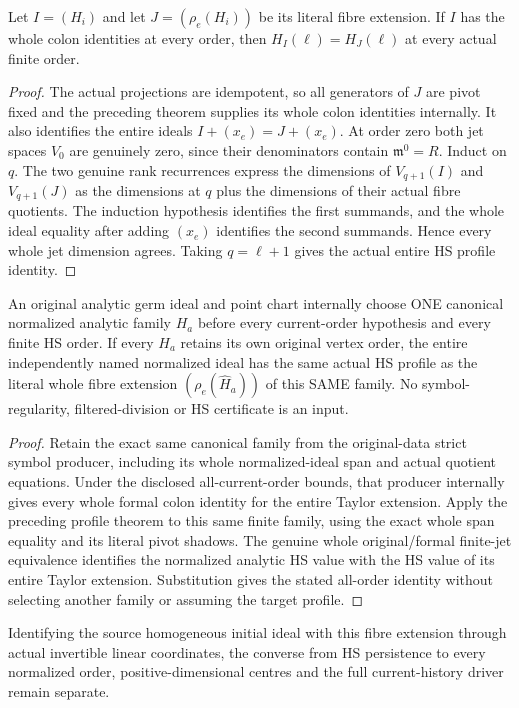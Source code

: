 \begin{theorem}
\label{hir:actual-exceptional-regular-symbol-fibre-hs-profile}
\leanok
Let $I=(H_i)$ and let $J=(\rho_e(H_i))$ be its literal fibre extension.
If $I$ has the whole colon identities at every order, then
$H_I(\ell)=H_J(\ell)$ at every actual finite order.
\end{theorem}
\begin{proof}
The actual projections are idempotent, so all generators of $J$ are
pivot fixed and the preceding theorem supplies its whole colon
identities internally. It also identifies the entire ideals
$I+(x_e)=J+(x_e)$. At order zero both jet spaces $V_0$ are genuinely
zero, since their denominators contain $\mathfrak m^0=R$.
Induct on $q$. The two genuine rank recurrences express the dimensions
of $V_{q+1}(I)$ and $V_{q+1}(J)$ as the dimensions at $q$ plus the
dimensions of their actual fibre quotients. The induction hypothesis
identifies the first summands, and the whole ideal equality after
adding $(x_e)$ identifies the second summands. Hence every whole jet
dimension agrees. Taking $q=\ell+1$ gives the actual entire HS profile
identity.
\end{proof}

\begin{theorem}
\label{hir:actual-original-point-order-retaining-fibre-hs-profile}
\leanok
An original analytic germ ideal and point chart internally choose ONE
canonical normalized analytic family $H_a$ before every current-order
hypothesis and every finite HS order. If every $H_a$ retains its own
original vertex order, the entire independently named normalized ideal
has the same actual HS profile as the literal whole fibre extension
$(\rho_e(\widehat H_a))$ of this SAME family. No symbol-regularity,
filtered-division or HS certificate is an input.
\end{theorem}
\begin{proof}
Retain the exact same canonical family from the original-data strict
symbol producer, including its whole normalized-ideal span and actual
quotient equations. Under the disclosed all-current-order bounds,
that producer internally gives every whole formal colon identity for
the entire Taylor extension. Apply the preceding profile theorem to
this same finite family, using the exact whole span equality and its
literal pivot shadows. The genuine whole original/formal finite-jet
equivalence identifies the normalized analytic HS value with the HS
value of its entire Taylor extension. Substitution gives the stated
all-order identity without selecting another family or assuming the
target profile.
\end{proof}

Identifying the source homogeneous initial ideal with this fibre
extension through actual invertible linear coordinates, the converse
from HS persistence to every normalized order, positive-dimensional
centres and the full current-history driver remain separate.
